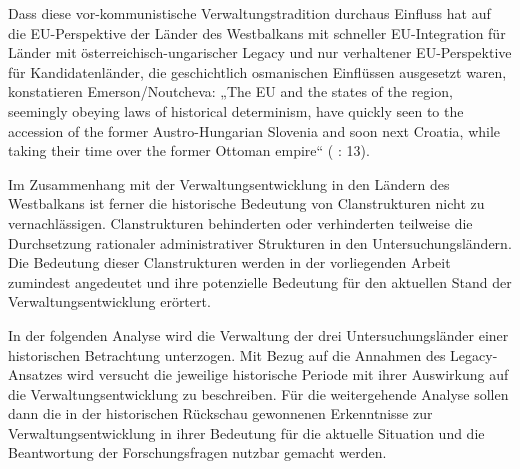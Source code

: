 Dass diese vor-kommunistische Verwaltungstradition durchaus Einfluss hat auf die EU-Perspektive der Länder des Westbalkans mit schneller EU-Integration für Länder mit österreichisch-ungarischer Legacy und nur verhaltener EU-Perspektive für Kandidatenländer, die geschichtlich osmanischen Einflüssen ausgesetzt waren, konstatieren Emerson/Noutcheva: „The EU and the states of the region, seemingly obeying laws of historical determinism, have quickly seen to the accession of the former Austro-Hungarian Slovenia and soon next Croatia, while taking their time over the former Ottoman empire“ (\cite{emenou} : 13). \par
Im Zusammenhang mit der Verwaltungsentwicklung in den Ländern des Westbalkans ist ferner die historische Bedeutung von Clanstrukturen nicht zu vernachlässigen. Clanstrukturen behinderten oder verhinderten teilweise die Durchsetzung rationaler administrativer Strukturen in den Untersuchungsländern. Die Bedeutung dieser Clanstrukturen werden in der vorliegenden Arbeit zumindest angedeutet und ihre potenzielle Bedeutung für den aktuellen Stand der Verwaltungsentwicklung erörtert.\par
In der folgenden Analyse wird die Verwaltung der drei Untersuchungsländer einer historischen Betrachtung unterzogen. Mit Bezug auf die Annahmen des Legacy-Ansatzes wird versucht die jeweilige historische Periode mit ihrer Auswirkung auf die Verwaltungsentwicklung zu beschreiben. Für die weitergehende Analyse sollen dann die in der historischen Rückschau gewonnenen Erkenntnisse zur Verwaltungsentwicklung in ihrer Bedeutung für die aktuelle Situation und die Beantwortung der Forschungsfragen nutzbar gemacht werden.

